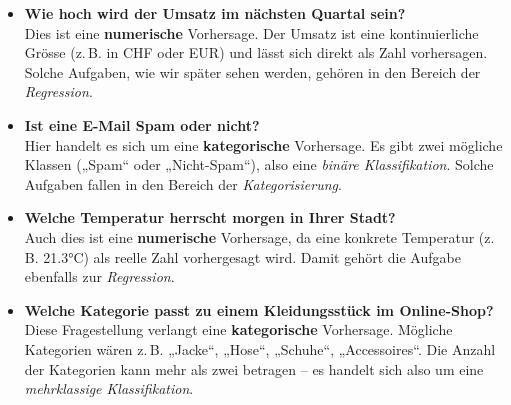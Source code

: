 \begin{aufgabe}{6}


\begin{itemize}
  \item \textbf{Wie hoch wird der Umsatz im nächsten Quartal sein?} \\
  Dies ist eine \textbf{numerische} Vorhersage. Der Umsatz ist eine kontinuierliche Grösse (z.\,B. in CHF oder EUR) und lässt sich direkt als Zahl vorhersagen. Solche Aufgaben, wie wir später sehen werden, gehören in den Bereich der \emph{Regression}.
  
  \item \textbf{Ist eine E-Mail Spam oder nicht?} \\
  Hier handelt es sich um eine \textbf{kategorische} Vorhersage. Es gibt zwei mögliche Klassen („Spam“ oder „Nicht-Spam“), also eine \emph{binäre Klassifikation}. Solche Aufgaben fallen in den Bereich der \emph{Kategorisierung}.
  
  \item \textbf{Welche Temperatur herrscht morgen in Ihrer Stadt?} \\
  Auch dies ist eine \textbf{numerische} Vorhersage, da eine konkrete Temperatur (z.\,B. 21.3°C) als reelle Zahl vorhergesagt wird. Damit gehört die Aufgabe ebenfalls zur \emph{Regression}.
  
  \item \textbf{Welche Kategorie passt zu einem Kleidungsstück im Online-Shop?} \\
  Diese Fragestellung verlangt eine \textbf{kategorische} Vorhersage. Mögliche Kategorien wären z.\,B. „Jacke“, „Hose“, „Schuhe“, „Accessoires“. Die Anzahl der Kategorien kann mehr als zwei betragen – es handelt sich also um eine \emph{mehrklassige Klassifikation}.
\end{itemize}
\end{aufgabe}



